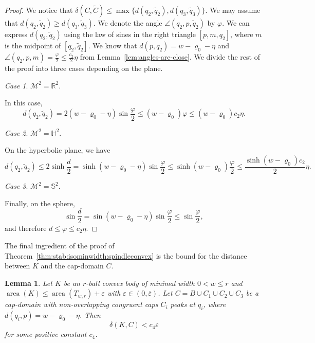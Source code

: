 \documentclass[12pt,reqno]{amsart}
\newtheorem{lemma}[theorem]{Lemma}
\theoremstyle{remark}
\newtheorem{case}{Case}
\newcommand{\R}{{\mathbb R}}
\newcommand{\hyp}{{\mathbb H}}
\newcommand{\sph}{{\mathbb S}}
\newcommand{\M}{\mathcal{M}}
\DeclareMathOperator{\area}{\mathrm{area}}
\begin{document}
\begin{proof}
We notice that $\delta(C,\widetilde{C})\leq\max\{d(q_2,\widetilde{q}_2),d(q_3,\widetilde{q}_3)\}$. We may assume that $d(q_2,\widetilde{q}_2)\geq d(q_3,\widetilde{q}_3)$. We denote the angle $\angle(q_2,p,\widetilde{q}_2)$ by $\varphi$. We can express $d(q_2,\widetilde{q}_2)$ using the law of sines in the right triangle $[p,m,q_2]$, where $m$ is the midpoint of $[q_2,\widetilde{q}_2]$. We know that $d(p,q_2)=w-\varrho_0-\eta$ and $\angle(q_2,p,m)=\frac{\varphi}{2}\leq\frac{c_2}{2}\eta$ from Lemma~\ref{lem:angles-are-close}. We divide the rest of the proof into three cases depending on the plane.

\begin{case}
$\M^2=\R^2$.
\end{case}

In this case,
\[
d(q_2,\widetilde{q}_2)=2(w-\varrho_0-\eta)\sin\frac{\varphi}{2}\leq(w-\varrho_0)\varphi\leq(w-\varrho_0)c_2\eta.
\]
\begin{case}
    $\M^2=\hyp^2$.
\end{case}

On the hyperbolic plane, we have
\[
d(q_2,\widetilde{q}_2)\leq2\sinh\frac{d}{2}=\sinh(w-\varrho_0-\eta)\sin\frac{\varphi}{2}\leq\sinh(w-\varrho_0)\frac{\varphi}{2}\leq\frac{\sinh(w-\varrho_0)c_2}{2}\eta.
\]

\begin{case}
    $\M^2=\sph^2$.
\end{case}

Finally, on the sphere,
\[
\sin\frac{d}{2}=\sin(w-\varrho_0-\eta)\sin\frac{\varphi}{2}\leq\sin\frac{\varphi}{2},
\]
and therefore $d\leq\varphi\leq c_2\eta$.
\end{proof}

The final ingredient of the proof of Theorem~\ref{thm:stab:isominwidth:spindleconvex} is the bound for the distance between $K$ and the cap-domain $C$.

\begin{lemma}\label{lem:distance-of-K-and-C}
Let $K$ be an $r$-ball convex body of minimal width $0<w\leq r$ and $\area(K)\leq\area(T_{w,r})+\varepsilon$ with $\varepsilon\in(0,\overline{\varepsilon})$. Let $C=B\cup C_1\cup C_2\cup C_3$ be a cap-domain with non-overlapping congruent caps $C_i$ peaks at $q_i$, where $d(q_i,p)=w-\varrho_0-\eta$. Then
$$
\delta(K,C)<c_4\varepsilon
$$
for some positive constant $c_4$.
\end{lemma}
\end{document}
